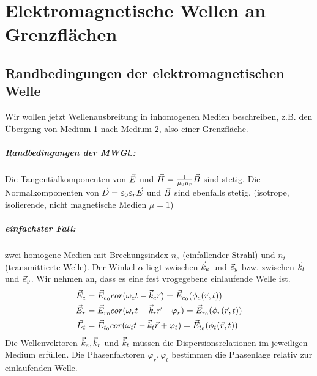




\chapter{Elektromagnetische Wellen an Grenzflächen}
\section{Randbedingungen der elektromagnetischen Welle}
Wir wollen jetzt Wellenausbreitung in inhomogenen Medien beschreiben, z.B. den Übergang von Medium 1 nach Medium 2, also einer Grenzfläche.
\paragraph{Randbedingungen der MWGl.:} Die Tangentialkomponenten von $\vec{E}$ und $\vec{H}=\frac{1}{\mu_0\mu_r}\vec{B}$ sind stetig. Die Normalkomponenten von $\vec{D}=\varepsilon_0\varepsilon_r\vec{E}$ und $\vec{B}$ sind ebenfalls stetig. (isotrope, isolierende, nicht magnetische Medien $\mu=1$)
\paragraph{einfachster Fall:}zwei homogene Medien mit Brechungsindex $n_e$ (einfallender Strahl) und $n_t$ (transmittierte Welle).
%
%
 Der Winkel $\alpha$ liegt zwischen $\vec{k}_e$ und $\vec{e}_y$ bzw. zwischen $\vec{k}_t$ und $\vec{e}_y$. Wir nehmen an, dass es eine fest vrogegebene einlaufende Welle ist.
 \begin{align*}
 	\vec{E}_e&=\vec{E}_{e_0}cor(\omega_et-\vec{k}_e\vec{r})=\vec{E}_{e_0}(\phi_e(\vec{r},t))\\
	\vec{E}_r&=\vec{E}_{r_0}cor(\omega_rt-\vec{k}_r\vec{r}+\varphi_r)=\vec{E}_{r_0}(\phi_r(\vec{r},t))\\
	\vec{E}_t&=\vec{E}_{t_0}cor(\omega_tt-\vec{k}_t\vec{r}+\varphi_t)=\vec{E}_{t_0}(\phi_t(\vec{r},t))
 \end{align*}
 Die Wellenvektoren $\vec{k}_e,\vec{k}_r$ und $\vec{k}_t$ müssen die Dispersionsrelationen im jeweiligen Medium erfüllen. Die Phasenfaktoren $\varphi_r,\varphi_t$ bestimmen die Phasenlage relativ zur einlaufenden Welle.
 
